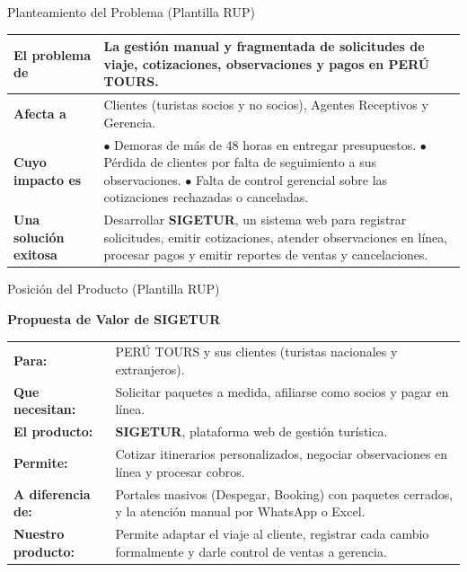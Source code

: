 \documentclass[aspectratio=169, 10pt]{beamer}
\begin{document}
\begin{frame}{Planteamiento del Problema (Plantilla RUP)}
    \small
    \begin{table}[H]
    \centering
    \begin{tabularx}{\textwidth}{|l|X|}
    \hline
    \textbf{El problema de} & La gestión manual y fragmentada de solicitudes de viaje, cotizaciones, observaciones y pagos en PERÚ TOURS. \\ \hline
    \textbf{Afecta a} & Clientes (turistas socios y no socios), Agentes Receptivos y Gerencia. \\ \hline
    \textbf{Cuyo impacto es} & 
    $\bullet$ Demoras de más de 48 horas en entregar presupuestos. \newline
    $\bullet$ Pérdida de clientes por falta de seguimiento a sus observaciones. \newline
    $\bullet$ Falta de control gerencial sobre las cotizaciones rechazadas o canceladas. \\ \hline
    \textbf{Una solución exitosa} & Desarrollar \textbf{SIGETUR}, un sistema web para registrar solicitudes, emitir cotizaciones, atender observaciones en línea, procesar pagos y emitir reportes de ventas y cancelaciones. \\ \hline
    \end{tabularx}
    \end{table}
\end{frame}

\begin{frame}{Posición del Producto (Plantilla RUP)}
    \renewcommand{\arraystretch}{1.3} %
    \begin{block}{\textbf{Propuesta de Valor de SIGETUR}}
        \small
        \begin{tabularx}{\textwidth}{lX}
            \textbf{Para:} & PERÚ TOURS y sus clientes (turistas nacionales y extranjeros). \\
            \textbf{Que necesitan:} & Solicitar paquetes a medida, afiliarse como socios y pagar en línea. \\
            \textbf{El producto:} & \textbf{SIGETUR}, plataforma web de gestión turística. \\
            \textbf{Permite:} & Cotizar itinerarios personalizados, negociar observaciones en línea y procesar cobros. \\
            \textbf{A diferencia de:} & Portales masivos (Despegar, Booking) con paquetes cerrados, y la atención manual por WhatsApp o Excel. \\
            \textbf{Nuestro producto:} & Permite adaptar el viaje al cliente, registrar cada cambio formalmente y darle control de ventas a gerencia.
        \end{tabularx}
    \end{block}
\end{frame}
\end{document}
